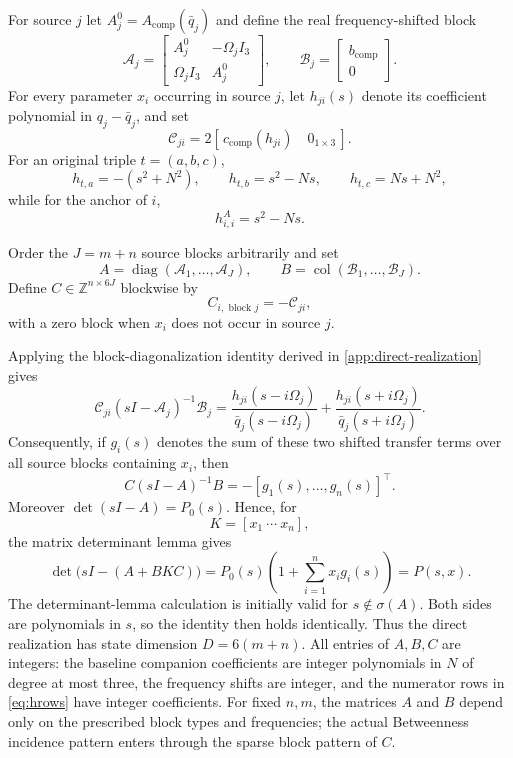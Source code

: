 \documentclass[final,5p,times,twocolumn]{elsarticle}
\begin{document}
For source $j$ let $A_j^0=A_{\mathrm{comp}}(\bar q_j)$ and define the real frequency-shifted block
\begin{equation}\label{eq:realify}
\mathcal A_j=
\begin{bmatrix}
A_j^0&-\Omega_jI_3\\
\Omega_jI_3&A_j^0
\end{bmatrix},
\qquad
\mathcal B_j=\begin{bmatrix}b_{\mathrm{comp}}\\0\end{bmatrix}.
\end{equation}
For every parameter $x_i$ occurring in source $j$, let $h_{ji}(s)$ denote its coefficient polynomial in $q_j-\bar q_j$, and set
\[
\mathcal C_{ji}=2[\,c_{\mathrm{comp}}(h_{ji})\quad 0_{1\times3}\,].
\]
For an original triple $t=(a,b,c)$,
\begin{equation}\label{eq:hrows}
 h_{t,a}=-(s^2+N^2),\qquad
 h_{t,b}=s^2-Ns,\qquad
 h_{t,c}=Ns+N^2,
\end{equation}
while for the anchor of $i$,
\[
h_{i,i}^{A}=s^2-Ns.
\]

Order the $J=m+n$ source blocks arbitrarily and set
\begin{equation}\label{eq:direct-ABC}
A=\operatorname{diag}(\mathcal A_1,\ldots,\mathcal A_J),
\qquad
B=\operatorname{col}(\mathcal B_1,\ldots,\mathcal B_J).
\end{equation}
Define $C\in\mathbb Z^{n\times6J}$ blockwise by
\begin{equation}\label{eq:C-block}
C_{i,\text{ block }j}=-\mathcal C_{ji},
\end{equation}
with a zero block when $x_i$ does not occur in source $j$.

Applying the block-diagonalization identity derived in \ref{app:direct-realization} gives
\[
\mathcal C_{ji}(sI-\mathcal A_j)^{-1}\mathcal B_j
=
\frac{h_{ji}(s-i\Omega_j)}{\bar q_j(s-i\Omega_j)}
+
\frac{h_{ji}(s+i\Omega_j)}{\bar q_j(s+i\Omega_j)}.
\]
Consequently, if $g_i(s)$ denotes the sum of these two shifted transfer terms over all source blocks containing $x_i$, then
\[
C(sI-A)^{-1}B=-[g_1(s),\ldots,g_n(s)]^\top.
\]
Moreover $\det(sI-A)=P_0(s)$. Hence, for
\[
K=[x_1\ \cdots\ x_n],
\]
the matrix determinant lemma gives
\begin{equation}\label{eq:char-poly}
\boxed{
\det\bigl(sI-(A+BKC)\bigr)
=P_0(s)\left(1+\sum_{i=1}^n x_i g_i(s)\right)
=P(s,x).
}
\end{equation}
The determinant-lemma calculation is initially valid for $s\notin\sigma(A)$. Both sides are polynomials in $s$, so the identity then holds identically.
Thus the direct realization has state dimension $D=6(m+n)$. All entries of $A,B,C$ are integers: the baseline companion coefficients are integer polynomials in $N$ of degree at most three, the frequency shifts are integer, and the numerator rows in \eqref{eq:hrows} have integer coefficients. For fixed $n,m$, the matrices $A$ and $B$ depend only on the prescribed block types and frequencies; the actual Betweenness incidence pattern enters through the sparse block pattern of $C$.
\end{document}

